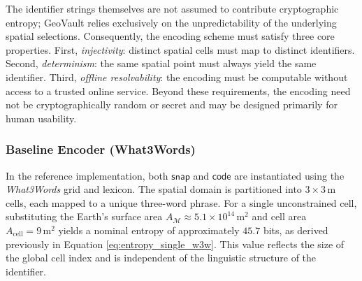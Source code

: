 \documentclass[mathematics,article,accept,pdftex,moreauthors]{Definitions/mdpi}
\begin{document}
The identifier strings themselves are not assumed to contribute cryptographic entropy; GeoVault relies exclusively on the unpredictability of the underlying spatial selections. Consequently, the encoding scheme must satisfy three core properties. First, \emph{injectivity}: distinct spatial cells must map to distinct identifiers. Second, \emph{determinism}: the same spatial point must always yield the same identifier. Third, \emph{offline resolvability}: the encoding must be computable without access to a trusted online service. Beyond these requirements, the encoding need not be cryptographically random or secret and may be designed primarily for human usability.

\subsubsection{Baseline Encoder (What3Words)}
In the reference implementation, both $\mathsf{snap}$ and $\mathsf{code}$ are instantiated using the \emph{What3Words} grid and lexicon. The spatial domain is partitioned into $3 \times 3\,\mathrm{m}$ cells, each mapped to a unique three-word phrase. For a single unconstrained cell, substituting the Earth’s surface area $A_{\mathcal{M}} \approx 5.1 \times 10^{14}\,\mathrm{m}^2$ and cell area $A_{\mathrm{cell}} = 9\,\mathrm{m}^2$ yields a nominal entropy of approximately $45.7$ bits, as derived previously in Equation \eqref{eq:entropy_single_w3w}. This value reflects the size of the global cell index and is independent of the linguistic structure of the identifier.
\end{document}
